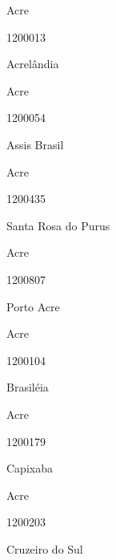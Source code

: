 \documentclass[
  letterpaper,
]{report}
\begin{document}
Acre

\n      

1200013

\n      

Acrelândia

\n    

\n    

\n      

Acre

\n      

1200054

\n      

Assis Brasil

\n    

\n    

\n      

Acre

\n      

1200435

\n      

Santa Rosa do Purus

\n    

\n    

\n      

Acre

\n      

1200807

\n      

Porto Acre

\n    

\n    

\n      

Acre

\n      

1200104

\n      

Brasiléia

\n    

\n    

\n      

Acre

\n      

1200179

\n      

Capixaba

\n    

\n    

\n      

Acre

\n      

1200203

\n      

Cruzeiro do Sul
\end{document}
